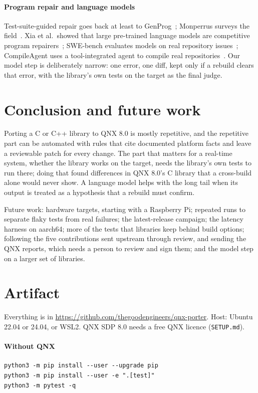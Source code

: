 \documentclass[conference]{IEEEtran}
\begin{document}
\paragraph{Program repair and language models} Test-suite-guided repair goes back at least to
GenProg~\cite{legoues2012}; Monperrus surveys the field~\cite{monperrus2018}. Xia et al.\ showed that large
pre-trained language models are competitive program repairers~\cite{xia2023}; SWE-bench evaluates models on
real repository issues~\cite{jimenez2024}; CompileAgent uses a tool-integrated agent to compile real
repositories~\cite{hu2025}. Our model step is deliberately narrow: one error, one diff, kept only if a rebuild
clears that error, with the library's own tests on the target as the final judge.

\section{Conclusion and future work}\label{sec:conclusion}

Porting a C or C++ library to QNX 8.0 is mostly repetitive, and the repetitive part can be automated with rules
that cite documented platform facts and leave a reviewable patch for every change. The part that matters for a
real-time system, whether the library works on the target, needs the library's own tests to run there; doing that
found differences in QNX 8.0's C library that a cross-build alone would never show. A language model helps with
the long tail when its output is treated as a hypothesis that a rebuild must confirm.

Future work: hardware targets, starting with a Raspberry Pi; repeated runs to separate flaky tests from real
failures; the latest-release campaign; the latency harness on aarch64; more of the tests that libraries keep
behind build options; following the five contributions sent upstream through review, and sending the QNX reports, which needs a
person to review and sign them; and the model step on a larger set of libraries.

\appendix
\section{Artifact}\label{app:artifact}

Everything is in \url{https://github.com/thegoodengineers/qnx-porter}. Host: Ubuntu 22.04 or 24.04, or WSL2. QNX
SDP 8.0 needs a free QNX licence (\texttt{SETUP.md}).

\paragraph{Without QNX}
\begin{verbatim}
python3 -m pip install --user --upgrade pip
python3 -m pip install --user -e ".[test]"
python3 -m pytest -q
\end{verbatim}
\end{document}

